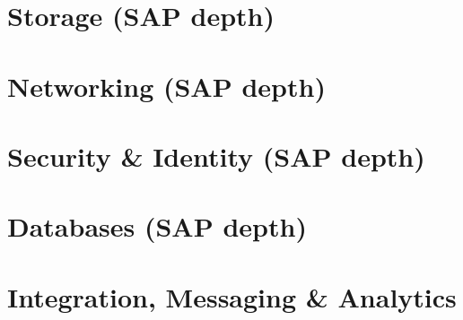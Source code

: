 \documentclass[12pt, a4paper]{article}
\begin{document}
\part{Storage (SAP depth)}




\part{Networking (SAP depth)}






\part{Security \& Identity (SAP depth)}




\part{Databases (SAP depth)}





\part{Integration, Messaging \& Analytics}
\end{document}
